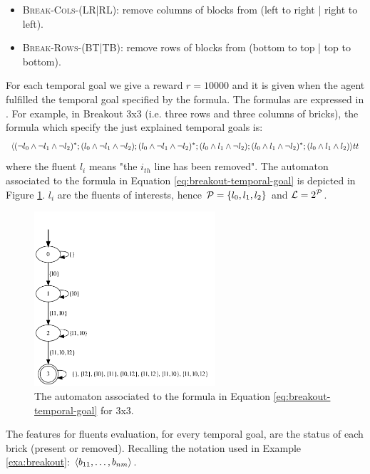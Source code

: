 \begin{itemize}
	\item \textsc{Break-Cols-(LR|RL)}:  remove columns of blocks from (left to right | right to left).
	\item \textsc{Break-Rows-(BT|TB)}:  remove rows of blocks from (bottom to top | top to bottom).
\end{itemize}

For each temporal goal we give a reward $r = 10000$ and it is given when the agent fulfilled the temporal goal specified by the formula.
The formulas are expressed in \LDLf. For example, in Breakout 3x3 (i.e. three rows and three columns of bricks), the formula which specify the just explained temporal goals is:
\begin{equation}\label{eq:breakout-temporal-goal}
\langle (\lnot l_0 \wedge \lnot l_1 \wedge \lnot l_2)^*;(l_0 \wedge \lnot l_1 \wedge \lnot l_2);(l_0 \wedge \lnot l_1 \wedge \lnot l_2)^*;(l_0 \wedge l_1 \wedge \lnot l_2);(l_0 \wedge l_1 \wedge \lnot l_2)^*;(l_0 \wedge l_1 \wedge l_2) \rangle tt
\end{equation}
where the fluent $l_i$ means "the $i_{th}$ line has been removed".
The automaton associated to the formula in Equation \ref{eq:breakout-temporal-goal} is depicted in Figure \ref{fig:breakout-automaton}. $l_i$ are the fluents of interests, hence $\mathcal{P} = \{l_0, l_1, l_2\}$ and $\mathcal{L} = 2^{\mathcal{P}}$.

\begin{figure}[h]
	\centering
	\includegraphics[width=0.6\textwidth]{images/breakout.png}
 	\caption{The automaton associated to the \LDLf formula in Equation \ref{eq:breakout-temporal-goal} for \Breakout 3x3.}
 	\label{fig:breakout-automaton}
\end{figure}

The features for fluents evaluation, for every temporal goal, are the status of each brick (present or removed). Recalling the notation used in Example \ref{exa:breakout}: $\langle b_{11}, \dots, b_{nm} \rangle$.

